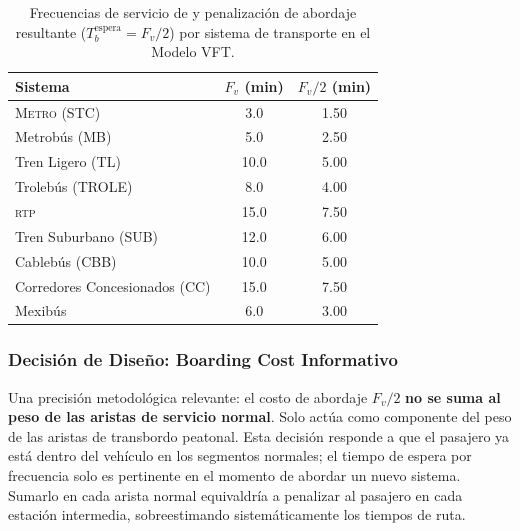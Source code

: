 \begin{table}[H]
    \centering
    \caption[Frecuencias de \textit{fallback} y costo de abordaje por sistema]{Frecuencias
    de servicio de  y penalización de abordaje resultante
($T_b^{\text{espera}} = F_v / 2$) por sistema de transporte en el Modelo VFT.}
    \label{tab:fallback-frecuencia}
    \begin{tabular}{|l|c|c|}
        \hline
        \textbf{Sistema} & \textbf{$F_v$ (min)} & \textbf{$F_v / 2$ (min)} \\
        \hline
        \textsc{Metro} (STC)          & 3.0  & 1.50 \\
        Metrobús (MB)                 & 5.0  & 2.50 \\
        Tren Ligero (TL)              & 10.0 & 5.00 \\
        Trolebús (TROLE)              & 8.0  & 4.00 \\
        \textsc{rtp}                  & 15.0 & 7.50 \\
        Tren Suburbano (SUB)          & 12.0 & 6.00 \\
        Cablebús (CBB)                & 10.0 & 5.00 \\
        Corredores Concesionados (CC) & 15.0 & 7.50 \\
        Mexibús                       & 6.0  & 3.00 \\
        \hline
    \end{tabular}
\end{table}

\subsubsection{Decisión de Diseño: Boarding Cost Informativo}
\label{subsubsec:boarding-cost-diseno}

Una precisión metodológica relevante: el costo de abordaje $F_v / 2$
\textbf{no se suma al peso de las aristas de servicio normal}. Solo actúa como
componente del peso de las aristas de transbordo peatonal. Esta decisión
responde a que el pasajero ya está dentro del vehículo en los segmentos
normales; el tiempo de espera por frecuencia solo es pertinente en el momento de
abordar un nuevo sistema. Sumarlo en cada arista normal equivaldría a penalizar
al pasajero en cada estación intermedia, sobreestimando sistemáticamente los
tiempos de ruta.

